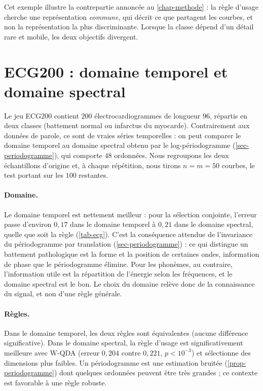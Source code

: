 Cet exemple illustre la contrepartie annoncée au \cref{chap-methode} : la règle d'usage cherche une représentation \emph{commune}, qui décrit ce que partagent les courbes, et non la représentation la plus discriminante. Lorsque la classe dépend d'un détail rare et mobile, les deux objectifs divergent.

\section{ECG200 : domaine temporel et domaine spectral}\label{sec-exp-ecg}

Le jeu ECG200 \citep{olszewski2001generalized,dau2019ucr} contient $200$ électrocardiogrammes de longueur $96$, répartis en deux classes (battement normal ou infarctus du myocarde). Contrairement aux données de parole, ce sont de vraies séries temporelles : on peut comparer le domaine temporel au domaine spectral obtenu par le log-périodogramme (\cref{sec-periodogramme}), qui comporte $48$ ordonnées. Nous regroupons les deux échantillons d'origine et, à chaque répétition, nous tirons $n=m=50$ courbes, le test portant sur les $100$ restantes.

\begin{table}[ht]
\centering
\small

\caption{ECG200, base \texttt{db4} : erreur de test (erreur standard) sur $100$ répétitions, dimension sélectionnée et $p$-valeur du test de Wilcoxon apparié entre les deux règles.}
\label{tab-ecg}
\end{table}

\paragraph{Domaine.} Le domaine temporel est nettement meilleur : pour la sélection conjointe, l'erreur passe d'environ $0{,}17$ dans le domaine temporel à $0{,}21$ dans le domaine spectral, quelle que soit la règle (\cref{tab-ecg}). C'est la conséquence attendue de l'invariance du périodogramme par translation (\cref{sec-periodogramme}) : ce qui distingue un battement pathologique est la forme et la position de certaines ondes, information de phase que le périodogramme élimine. Pour les phonèmes, au contraire, l'information utile est la répartition de l'énergie selon les fréquences, et le domaine spectral est le bon. Le choix du domaine relève donc de la connaissance du signal, et non d'une règle générale.

\paragraph{Règles.} Dans le domaine temporel, les deux règles sont équivalentes (aucune différence significative). Dans le domaine spectral, la règle d'usage est significativement meilleure avec W-QDA (erreur $0{,}204$ contre $0{,}221$, $p<10^{-3}$) et sélectionne des dimensions plus faibles. Un périodogramme est une estimation bruitée (\cref{prop-periodogramme}) dont quelques ordonnées peuvent être très grandes ; ce contexte est favorable à une règle robuste.

